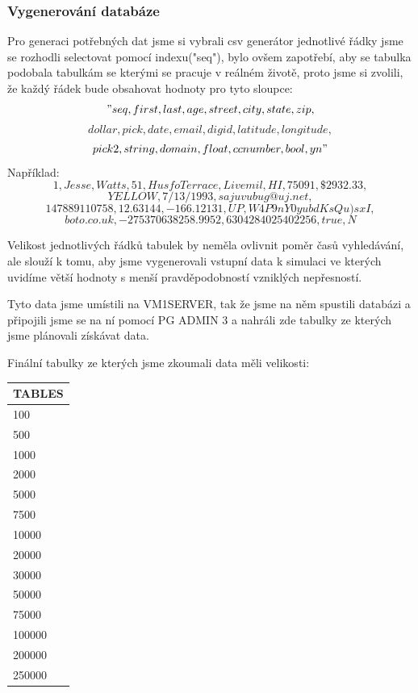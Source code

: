 \documentclass[a4paper, 11pt]{article}
\begin{document}
\subsubsection{Vygenerování databáze} \label{sec:table}

Pro generaci potřebných dat jsme si vybrali csv generátor \cite{csvgenerator} jednotlivé řádky jsme se rozhodli selectovat pomocí indexu("seq"), bylo ovšem zapotřebí, aby se tabulka podobala tabulkám se kterými se pracuje v reálném životě, proto jsme si zvolili, že každý řádek bude obsahovat hodnoty pro tyto sloupce:
$$"seq, first, last, age, street, city, state, zip, $$
$$dollar, pick, date, email, digid, latitude, longitude, $$
$$pick2, string, domain, float, ccnumber, bool, yn"$$
Například:
$$1,Jesse,Watts,51,Husfo Terrace,Livemil,HI,75091,\$2932.33,$$
$$YELLOW,7/13/1993,sajuvubug@uj.net,$$
$$147889110758,12.63144,-166.12131,UP,W4P9nY0yubdKsQu)sxI,$$
$$boto.co.uk,-275370638258.9952,6304284025402256,true,N$$


Velikost jednotlivých řádků tabulek by neměla ovlivnit poměr časů vyhledávání, ale slouží k tomu, aby jsme vygenerovali vstupní data k simulaci ve kterých uvidíme větší hodnoty s menší pravděpodobností vzniklých nepřesností.

Tyto data jsme umístili na VM1SERVER, tak že jsme na něm spustili databázi a připojili jsme se na ní pomocí PG ADMIN 3 \cite{pgadmin} a nahráli zde tabulky ze kterých jsme plánovali získávat data.

Finální tabulky ze kterých jsme zkoumali data měli velikosti:
\begin{center}
\begin{tabular}{ |l| }
  \hline
	TABLES \\
  \hline
100 \\
500 \\
1000 \\
2000 \\
5000 \\
7500 \\
10000 \\
20000 \\
30000 \\
50000 \\
75000 \\
100000 \\
200000 \\
250000 \\
  \hline
\end{tabular}
\end{center}
\end{document}
